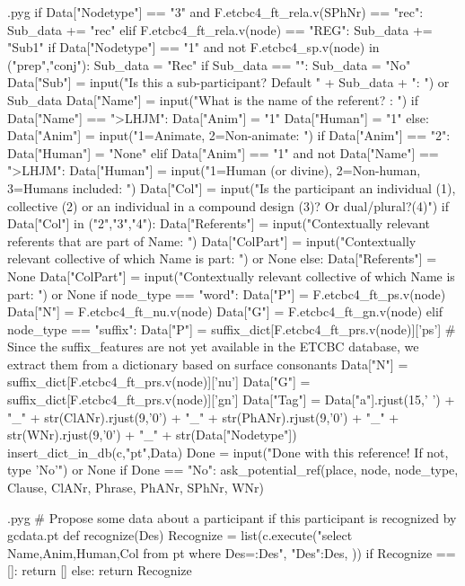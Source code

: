 \documentclass{report}
\makeatletter
\newenvironment{python}{%
  \VerbatimEnvironment
  \minted@resetoptions
  \setkeys{minted@opt}{}
      \begin{VerbatimOut}{\jobname.pyg}}
{%
      \end{VerbatimOut}
      \minted@pygmentize{python}
      \DeleteFile{\jobname.pyg}}
\makeatother
\begin{document}
\begin{python}
        if Data["Nodetype"] == "3" and F.etcbc4_ft_rela.v(SPhNr) == "rec":
            Sub_data += "rec"
        elif F.etcbc4_ft_rela.v(node) == "REG":
            Sub_data += "Sub1"
        if Data["Nodetype"] == "1" and not F.etcbc4_sp.v(node) in ("prep","conj"):
            Sub_data = "Rec"
        if Sub_data == "":
            Sub_data = "No"
        Data["Sub"] = input("Is this a sub-participant? Default " + Sub_data + ": ") or Sub_data
        Data["Name"] = input("What is the name of the referent? : ")
        if Data["Name"] == ">LHJM":
            Data["Anim"] = "1"
            Data["Human"] = "1"
        else:
            Data["Anim"] = input("1=Animate, 2=Non-animate: ")
        if Data["Anim"] == "2":
            Data["Human"] = "None"
        elif Data["Anim"] == "1" and not Data["Name"] == ">LHJM":
            Data["Human"] = input("1=Human (or divine), 2=Non-human, 3=Humans included: ")
        Data["Col"] = input("Is the participant an individual (1), collective (2) or an individual in a compound design (3)? Or dual/plural?(4)")
        if Data["Col"] in ("2","3","4"):
            Data["Referents"] = input("Contextually relevant referents that are part of Name: ")
            Data["ColPart"] = input("Contextually relevant collective of which Name is part: ") or None
        else:
            Data["Referents"] = None
            Data["ColPart"] = input("Contextually relevant collective of which Name is part: ") or None
        if node_type == "word":
            Data["P"] = F.etcbc4_ft_ps.v(node)
            Data["N"] = F.etcbc4_ft_nu.v(node)
            Data["G"] = F.etcbc4_ft_gn.v(node)
        elif node_type == "suffix":
            Data["P"] = suffix_dict[F.etcbc4_ft_prs.v(node)]['ps']    # Since the suffix_features are not yet available in the ETCBC database, we extract them from a dictionary based on surface consonants
            Data["N"] = suffix_dict[F.etcbc4_ft_prs.v(node)]['nu']
            Data["G"] = suffix_dict[F.etcbc4_ft_prs.v(node)]['gn']
        Data["Tag"] = Data["a"].rjust(15,' ') + "_" + str(ClANr).rjust(9,'0') + "_" + str(PhANr).rjust(9,'0') + "_" + str(WNr).rjust(9,'0') + "_" + str(Data["Nodetype"])
        insert_dict_in_db(c,"pt",Data)
        Done = input("Done with this reference! If not, type 'No'") or None
        if Done == "No":
            ask_potential_ref(place, node, node_type, Clause, ClANr, Phrase, PhANr, SPhNr, WNr)

\end{python}

\begin{python}
# Propose some data about a participant if this participant is recognized by gcdata.pt
def recognize(Des)
    Recognize = list(c.execute("select Name,Anim,Human,Col from pt where Des=:Des", {"Des":Des, }))
    if Recognize == []:
        return []
    else:
        return Recognize
\end{python}
\end{document}
